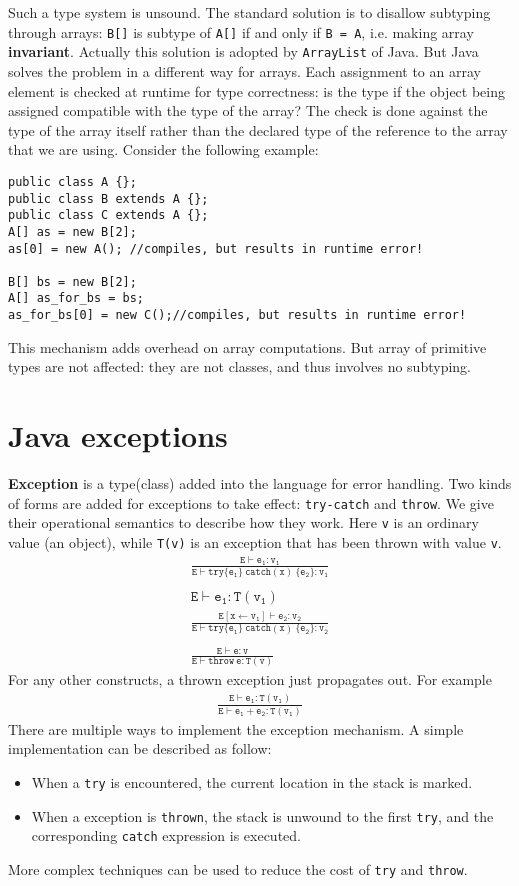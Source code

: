Such a type system is unsound. The standard solution is to disallow subtyping through arrays: \texttt{B[]} is subtype of \texttt{A[]} if and only if \texttt{B = A}, i.e. making array \textbf{invariant}. Actually this solution is adopted by \texttt{ArrayList} of Java. But Java solves the problem in a different way for arrays. Each assignment to an array element is checked at runtime for type correctness: is the type if the object being assigned compatible with the type of the array? The check is done against the type of the array itself rather than the declared type of the reference to the array that we are using. Consider the following example:
\begin{lstlisting}
public class A {};
public class B extends A {};
public class C extends A {};
A[] as = new B[2];
as[0] = new A(); //compiles, but results in runtime error!

B[] bs = new B[2];
A[] as_for_bs = bs;
as_for_bs[0] = new C();//compiles, but results in runtime error!
\end{lstlisting}
This mechanism adds overhead on array computations. But array of primitive types are not affected: they are not classes, and thus involves no subtyping.
\section{Java exceptions}
\textbf{Exception} is a type(class) added into the language for error handling. Two kinds of forms are added for exceptions to take effect: \texttt{try-catch} and \texttt{throw}. We give their operational semantics to describe how they work. Here \texttt{v} is an ordinary value (an object), while \texttt{T(v)} is an exception that has been thrown with value \texttt{v}. 
\begin{gather*}
\mathtt{\frac{E\vdash e_1 : v_1}{E\vdash try\{e_1\}\:catch(x)\:\{e_2\} : v_1}}\\
\\
\mathtt{E\vdash e_1:T(v_1)}\\
\mathtt{\frac{E[x\leftarrow v_1]\vdash e_2:v_2}{E\vdash try\{e_1\}\:catch(x)\:\{e_2\} : v_2}}\\
\\
\mathtt{\frac{E\vdash e:v}{E\vdash throw\:e:T(v)}}
\end{gather*}
For any other constructs, a thrown exception just propagates out. For example
\begin{gather*}
\mathtt{\frac{E\vdash e_1:T(v_1)}{E\vdash e_1+e_2:T(v_1)}}
\end{gather*} 
There are multiple ways to implement the exception mechanism. A simple implementation can be described as follow:
\begin{itemize}
\item When a \texttt{try} is encountered, the current location in the stack is marked.
\item When a exception is \texttt{thrown}, the stack is unwound to the first \texttt{try}, and the corresponding \texttt{catch} expression is executed.
\end{itemize}
More complex techniques can be used to reduce the cost of \texttt{try} and \texttt{throw}.
